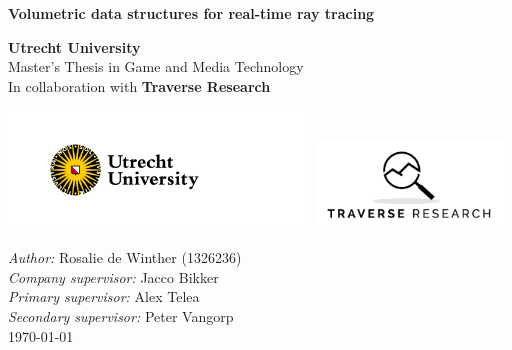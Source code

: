 \documentclass{article}
\begin{document}
\begin{titlepage}
    \begin{center}
        \vspace*{4cm}

        \hline
        \vspace{.5cm}
        \textbf{\huge Volumetric data structures for real-time ray tracing}
        \vspace{.5cm}
        \hline

        \vspace{1cm}

        
            
            \large \textbf{Utrecht University}\\
            Master's Thesis in Game and Media Technology\\
            \vspace{.5cm}
            \large In collaboration with \textbf{Traverse Research}
            

        \vspace{6cm}

        \includegraphics[width = 8cm]{figures/UU_logo_2021_EN_RGB.png}
        \hfill
        \includegraphics[width = 5cm]{figures/Traverse+Research+Cropped.png}

        \vspace{1cm}

        \raggedright \textit{Author:} Rosalie de Winther (1326236)\\
        \textit{Company supervisor:} Jacco Bikker\\
        \textit{Primary supervisor:} Alex Telea\\
        \textit{Secondary supervisor:} Peter Vangorp\\
        \today

    \end{center}
\end{titlepage}



\clearpage

\clearpage

\clearpage
\tableofcontents
\clearpage

\clearpage

\clearpage

\clearpage

\clearpage

\clearpage

\clearpage

\clearpage

\clearpage




\end{document}

